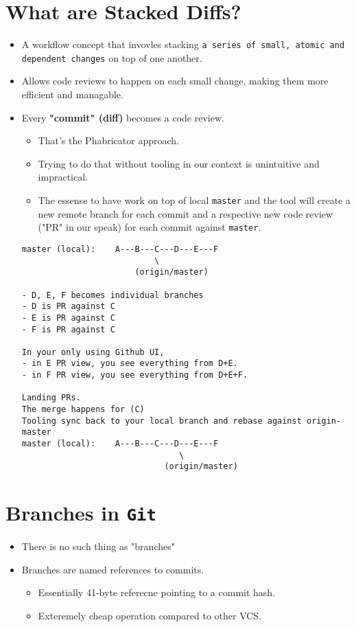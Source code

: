 \documentclass[11pt]{article}
\begin{document}
\section{What are Stacked Diffs?}
\label{sec:org5a9d651}
\begin{itemize}
\item A workflow concept that invovles stacking \texttt{a series of small, atomic and dependent changes} on top of one another.
\item Allows code reviews to happen on each small change, making them more efficient and managable.
\item Every \textbf{"commit" (diff)} becomes a code review.
\begin{itemize}
\item That's the Phabricator approach.
\item Trying to do that without tooling in our context is unintuitive and impractical.
\item The essense to have work on top of local \texttt{master} and the tool will create a new remote branch for each commit and a respective new code review ("PR" in our speak) for each commit against \texttt{master}.
\end{itemize}
\begin{verbatim}
master (local):    A---B---C---D---E---F
                           \
                       (origin/master)

- D, E, F becomes individual branches
- D is PR against C
- E is PR against C
- F is PR against C

In your only using Github UI,
- in E PR view, you see everything from D+E.
- in F PR view, you see everything from D+E+F.

Landing PRs.
The merge happens for (C)
Tooling sync back to your local branch and rebase against origin-master
master (local):    A---B---C---D---E---F
                                \
                             (origin/master)

\end{verbatim}
\end{itemize}
\section{Branches in \texttt{Git}}
\label{sec:org247ce01}
\begin{itemize}
\item There is no such thing as "branches"
\item Branches are named references to commits.
\begin{itemize}
\item Essentially 41-byte referecne pointing to a commit hash.
\item Exteremely cheap operation compared to other VCS.
\end{itemize}
\end{itemize}
\end{document}
